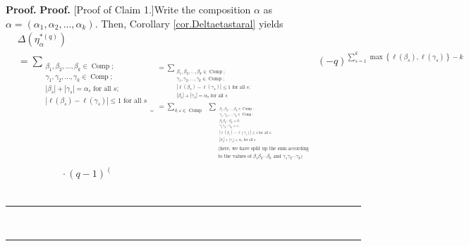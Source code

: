 \documentclass[numbers=enddot,12pt,final,onecolumn,notitlepage]{scrartcl}%
\theoremstyle{definition}
\newenvironment{proof}[1][Proof]{\noindent\textbf{#1.} }{\ \rule{0.5em}{0.5em}}
\let\sumnonlimits\sum
\renewcommand{\sum}{\sumnonlimits\limits}
\begin{document}
\begin{proof}
\begin{proof}
[Proof of Claim 1.]Write the composition $\alpha$ as $\alpha=\left(
\alpha_{1},\alpha_{2},\ldots,\alpha_{k}\right)  $. Then, Corollary
\ref{cor.Deltaetastaral} yields
\begin{align*}
&  \Delta\left(  \eta_{\alpha}^{\ast\left(  q\right)  }\right) \\
&  =\underbrace{\sum_{\substack{\beta_{1},\beta_{2},\ldots,\beta_{k}%
\in\operatorname*{Comp};\\\gamma_{1},\gamma_{2},\ldots,\gamma_{k}%
\in\operatorname*{Comp};\\\left\vert \beta_{s}\right\vert +\left\vert
\gamma_{s}\right\vert =\alpha_{s}\text{ for all }s;\\\left\vert \ell\left(
\beta_{s}\right)  -\ell\left(  \gamma_{s}\right)  \right\vert \leq1\text{ for
all }s}}}_{\substack{=\sum_{\substack{\beta_{1},\beta_{2},\ldots,\beta_{k}%
\in\operatorname*{Comp};\\\gamma_{1},\gamma_{2},\ldots,\gamma_{k}%
\in\operatorname*{Comp};\\\left\vert \ell\left(  \beta_{s}\right)
-\ell\left(  \gamma_{s}\right)  \right\vert \leq1\text{ for all }%
s;\\\left\vert \beta_{s}\right\vert +\left\vert \gamma_{s}\right\vert
=\alpha_{s}\text{ for all }s}}\\=\sum_{\delta,\varepsilon\in
\operatorname*{Comp}}\ \ \sum_{\substack{_{\substack{\beta_{1},\beta
_{2},\ldots,\beta_{k}\in\operatorname*{Comp};\\\gamma_{1},\gamma_{2}%
,\ldots,\gamma_{k}\in\operatorname*{Comp};\\\beta_{1}\beta_{2}\cdots\beta
_{k}=\delta;\\\gamma_{1}\gamma_{2}\cdots\gamma_{k}=\varepsilon;\\\left\vert
\ell\left(  \beta_{s}\right)  -\ell\left(  \gamma_{s}\right)  \right\vert
\leq1\text{ for all }s;\\\left\vert \beta_{s}\right\vert +\left\vert
\gamma_{s}\right\vert =\alpha_{s}\text{ for all }s}}\\\text{(here, we have
split up the sum according}\\\text{to the values of }\beta_{1}\beta_{2}%
\cdots\beta_{k}\text{ and }\gamma_{1}\gamma_{2}\cdots\gamma_{k}\text{)}}%
}}}\left(  -q\right)  ^{\sum_{s=1}^{k}\max\left\{  \ell\left(  \beta
_{s}\right)  ,\ell\left(  \gamma_{s}\right)  \right\}  -k}\\
&  \ \ \ \ \ \ \ \ \ \ \ \ \ \ \ \ \ \ \ \ \cdot\left(  q-1\right)  ^{\left(
}
\end{align*}
\end{proof}
\end{proof}
\end{document}
